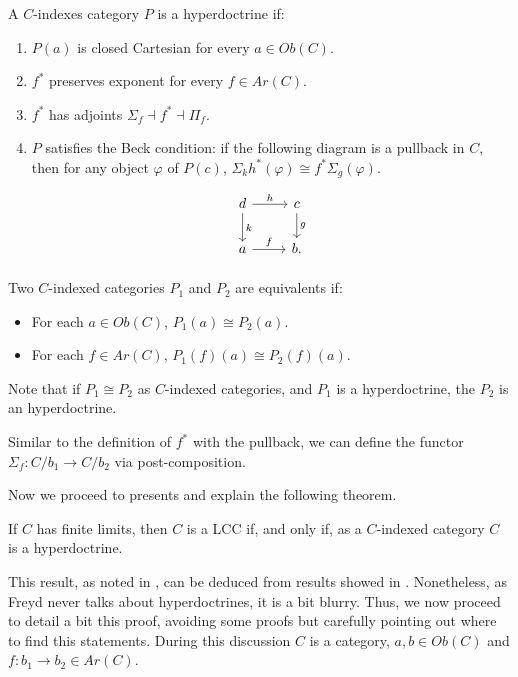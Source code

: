 \begin{definition}
  A $C$-indexes category $P$ is a hyperdoctrine if:
  \begin{enumerate}
  \item $P(a)$ is closed Cartesian for every $a\in Ob(C)$.
  \item $f^*$ preserves exponent for every $f\in Ar(C)$.
  \item $f^*$ has adjoints $\Sigma_f \dashv f^* \dashv \Pi_f$.
  \item $P$ satisfies the Beck condition: if the following diagram is a pullback in $C$, then for any object $\varphi$ of $P(c)$, $\Sigma_k h^*(\varphi) \cong f^*\Sigma_g(\varphi)$.
    \[
      \begin{tikzpicture}
        \node {\begin{tikzcd}
            d\ar[r,"h"]\ar[d,"k"] & c\ar[d,"g"]\\
            a\ar[r,"f"] &   b.
          \end{tikzcd}};
      \end{tikzpicture}
    \]
    
  \end{enumerate}
\end{definition}
\begin{definition}
  Two $C$-indexed categories $P_1$ and $P_2$ are equivalents if:
  \begin{itemize}
  \item For each $a\in Ob(C)$, $P_1(a)\cong P_2(a)$.
  \item For each $f\in Ar(C)$, $P_1(f)(a)\cong P_2(f)(a)$.
  \end{itemize}
\end{definition}

Note that if $P_1\cong P_2$ as $C$-indexed categories, and $P_1$ is a hyperdoctrine, the $P_2$ is an hyperdoctrine.

\begin{remark}
  Similar to the definition of $f^*$ with the pullback, we can define the functor $\Sigma_f: C/b_1 \to C/b_2$ via post-composition. 
\end{remark}


Now we proceed to presents and explain the following theorem.

\begin{theorem}
  If $C$ has finite limits, then $C$ is a LCC if, and only if, as a $C$-indexed category $C$ is a hyperdoctrine. 
\end{theorem}

This result, as noted in \cites{seely1984locally}, can be deduced from results showed in \cite[Section 1.3]{freyd1972aspects}. Nonetheless, as Freyd never talks about hyperdoctrines, it is a bit blurry. Thus, we now proceed to detail a bit this proof, avoiding some proofs but carefully pointing out where to find this statements. During this discussion $C$ is a category, $a,b\in Ob(C)$ and $f:b_1\to b_2\in Ar(C)$.\\


